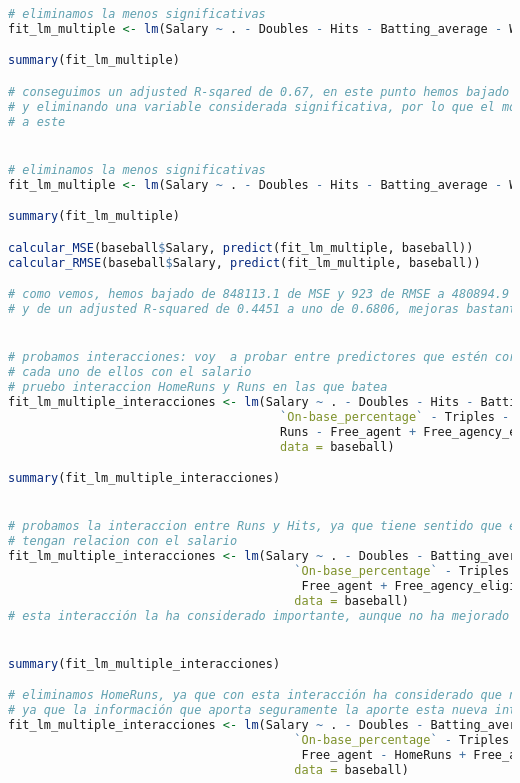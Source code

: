 \begin{lstlisting}[language=R]
# eliminamos la menos significativas
fit_lm_multiple <- lm(Salary ~ . - Doubles - Hits - Batting_average - Walks - `On-base_percentage` - Triples - Arbitration - Errors - Runs - Free_agent - HomeRuns, data = baseball)

summary(fit_lm_multiple)

# conseguimos un adjusted R-sqared de 0.67, en este punto hemos bajado un 1% de golpe,
# y eliminando una variable considerada significativa, por lo que el modelo final será el anterior
# a este


# eliminamos la menos significativas
fit_lm_multiple <- lm(Salary ~ . - Doubles - Hits - Batting_average - Walks - `On-base_percentage` - Triples - Arbitration - Errors - Runs - Free_agent, data = baseball)

summary(fit_lm_multiple)

calcular_MSE(baseball$Salary, predict(fit_lm_multiple, baseball))
calcular_RMSE(baseball$Salary, predict(fit_lm_multiple, baseball))

# como vemos, hemos bajado de 848113.1 de MSE y 923 de RMSE a 480894.9 y 695 respectivamente,
# y de un adjusted R-squared de 0.4451 a uno de 0.6806, mejoras bastante significativas


# probamos interacciones: voy  a probar entre predictores que estén correlados entre si, y
# cada uno de ellos con el salario
# pruebo interaccion HomeRuns y Runs en las que batea
fit_lm_multiple_interacciones <- lm(Salary ~ . - Doubles - Hits - Batting_average - Walks -
									  `On-base_percentage` - Triples - Arbitration - Errors -
									  Runs - Free_agent + Free_agency_eligibility*Runs_batted_in,
									  data = baseball)

summary(fit_lm_multiple_interacciones)


# probamos la interaccion entre Runs y Hits, ya que tiene sentido que estas dos
# tengan relacion con el salario
fit_lm_multiple_interacciones <- lm(Salary ~ . - Doubles - Batting_average - Walks -
										`On-base_percentage` - Triples - Arbitration - Errors -
										 Free_agent + Free_agency_eligibility*Runs_batted_in + Runs*Hits,
										data = baseball)
# esta interacción la ha considerado importante, aunque no ha mejorado mucho el R-squared


summary(fit_lm_multiple_interacciones)

# eliminamos HomeRuns, ya que con esta interacción ha considerado que no es importante
# ya que la información que aporta seguramente la aporte esta nueva interaccion
fit_lm_multiple_interacciones <- lm(Salary ~ . - Doubles - Batting_average - Walks -
										`On-base_percentage` - Triples - Arbitration - Errors -
										 Free_agent - HomeRuns + Free_agency_eligibility*Runs_batted_in + Runs*Hits,
										data = baseball)


\end{lstlisting}

